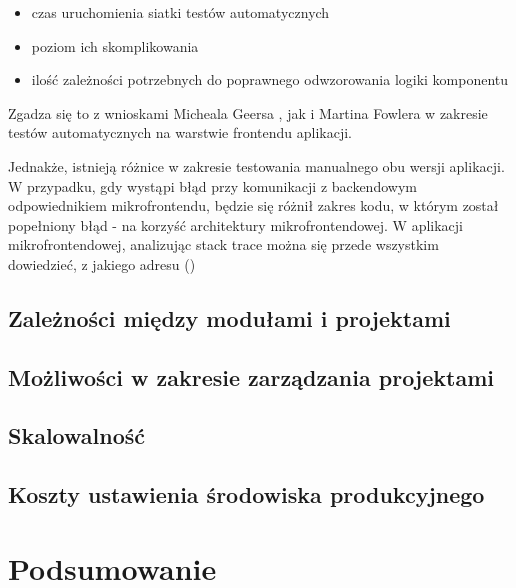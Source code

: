 \documentclass{SGGW-thesis}
\begin{document}
  \begin{itemize}
    \item czas uruchomienia siatki testów automatycznych
    \item poziom ich skomplikowania
    \item ilość zależności potrzebnych do poprawnego odwzorowania logiki komponentu
  \end{itemize}


  Zgadza się to z wnioskami Micheala Geersa \cite{geers_2020}, jak i Martina Fowlera \cite{fowler_2019} w zakresie testów automatycznych na warstwie frontendu aplikacji.
  
  Jednakże, istnieją różnice w zakresie testowania manualnego obu wersji aplikacji. W przypadku, gdy wystąpi błąd przy komunikacji z backendowym odpowiednikiem mikrofrontendu, będzie się różnił zakres kodu, w którym został popełniony błąd - na korzyść architektury mikrofrontendowej. W aplikacji mikrofrontendowej, analizując stack trace można się przede wszystkim dowiedzieć, z jakiego adresu ()

  \section{Zależności między modułami i projektami}
  \section{Możliwości w zakresie zarządzania projektami}
  \section{Skalowalność}
  \section{Koszty ustawienia środowiska produkcyjnego}

\chapter{Podsumowanie}

\printbibliography[heading=bibnumbered,title={Bibliografia}]



\beforelastpage
\end{document}
